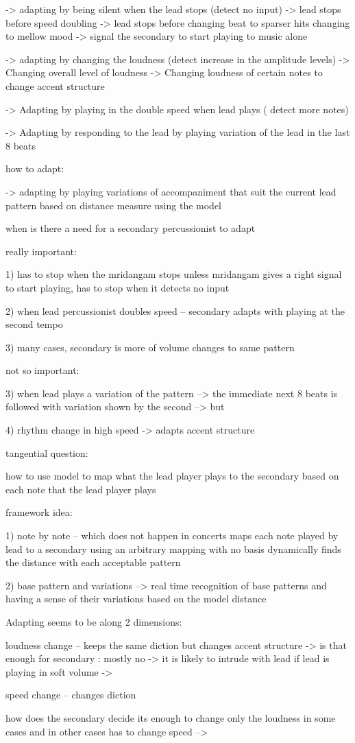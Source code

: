 -> adapting by being silent when the lead stops (detect no input)
   -> lead stops before speed doubling
   -> lead stops before changing beat to sparser hits changing to mellow mood
   -> signal the secondary to start playing to music alone

-> adapting by changing the loudness (detect increase in the amplitude levels)
    -> Changing overall level of loudness
    -> Changing loudness of certain notes to change accent structure

-> Adapting by playing in the double speed when lead plays ( detect more notes)

-> Adapting by responding to the lead by playing variation of the lead in the last 8 beats

how to adapt:

-> adapting by playing variations of accompaniment that suit the current lead pattern based on distance measure using the model

when is there a need for a secondary percussionist to adapt

really important:

1) has to stop when the mridangam stops unless mridangam gives a right signal to start playing, has to stop when it detects no input

2) when lead percussionist doubles speed -- secondary adapts with playing at the second tempo

3) many cases, secondary is more of volume changes to same pattern

not so important:

3) when lead plays a variation of the pattern --> the immediate next 8 beats is followed with variation shown by the second --> but 

4) rhythm change in high speed -> adapts accent structure

tangential question:

how to use model to map what the lead player plays to the secondary based on each note that the lead player plays

framework idea:

1) note by note -- which does not happen in concerts
maps each note played by lead to a secondary using an arbitrary mapping with no basis
dynamically finds the distance with each acceptable pattern

2) base pattern and variations --> 
real time recognition of base patterns and having a sense of their variations based on the model distance


Adapting seems to be along 2 dimensions:

loudness change -- keeps the same diction but changes accent structure 
	 -> is that enough for secondary : mostly no -> it is likely to intrude with lead if lead is playing in soft volume
	 -> 

         speed change -- changes diction

how does the secondary decide its enough to change only the loudness in some cases and in other cases has to change speed --> 



